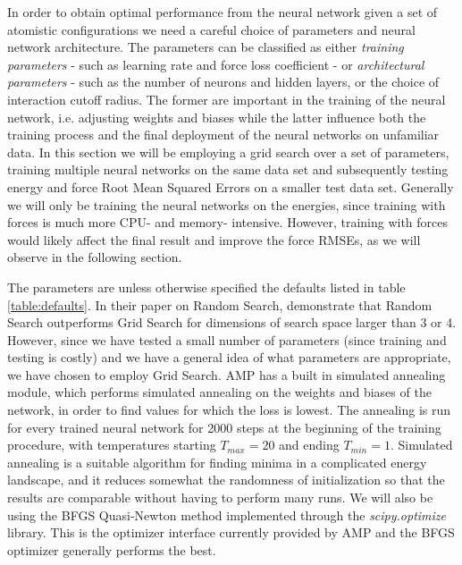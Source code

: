 In order to obtain optimal performance from the neural network
given a set of atomistic configurations we need a careful choice of parameters
and neural network architecture. The parameters can be classified as either
\textit{training parameters} - such as learning rate and force loss coefficient -
or \textit{architectural parameters} - such as the number of neurons and hidden layers,
or the choice of interaction cutoff radius. The former are important
in the training of the neural network, i.e. adjusting weights and biases
while the latter influence both the training process and the final
deployment of the neural networks on unfamiliar data.
In this section we will be employing a grid search over a set of
parameters, training multiple neural networks on the same data set
and subsequently testing energy and force Root Mean Squared Errors on
a smaller test data set. Generally we will only be training the neural networks
on the energies, since training with forces is much more CPU- and memory-
intensive. However, training with forces would likely affect the final
result and improve the force RMSEs, as we will observe in the following section.
\par
The parameters are unless otherwise specified the defaults listed
in table \ref{table:defaults}.
In their paper on Random Search, \parencite[Bergstra and Bengio]{
    bergstra2012random}
demonstrate that Random Search outperforms Grid Search for dimensions
of search space larger than 3 or 4. However, since we have tested
a small number of parameters (since training and testing is costly)
and we have a general idea of what parameters are appropriate, we
have chosen to employ Grid Search.
AMP has a built in simulated annealing module, which performs
simulated annealing on the weights and biases of the network,
in order to find values for which the loss is lowest.
The annealing is run for every trained neural network
for 2000 steps at the beginning of the training procedure,
with temperatures starting $T_{max} = 20$ and ending $T_{min} = 1$.
Simulated annealing is a suitable algorithm for finding minima
in a complicated energy landscape, and it reduces somewhat
the randomness of initialization so that the results are comparable
without having to perform many runs.
We will also be using the BFGS Quasi-Newton method implemented
through the \textit{scipy.optimize} library. This is
the optimizer interface currently provided by AMP
and the BFGS optimizer generally performs the best.

